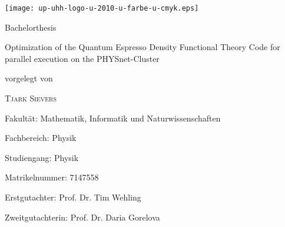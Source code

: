 \documentclass[main.tex]{subfiles}
\begin{document}
\begin{titlepage}
    \texttt{[image: up-uhh-logo-u-2010-u-farbe-u-cmyk.eps]}\par
    \vspace{4\baselineskip}

    \begin{center}
        {\Large\textcolor{UHHred}{Bachelorthesis}\par}

        {\Huge Optimization of the Quantum Espresso Density Functional Theory Code for parallel execution on the PHYSnet-Cluster\par}

        \vspace{4\baselineskip}

        vorgelegt von\par

        {\Large\textsc{Tjark Sievers}\par}
    \end{center}

    \vfill

    Fakultät: Mathematik, Informatik und Naturwissenschaften\par
    Fachbereich: Physik\par
    Studiengang: Physik\par
    Matrikelnummer: 7147558\par
 
    Erstgutachter: Prof. Dr. Tim Wehling \par
    Zweitgutachterin: Prof. Dr. Daria Gorelova \par
\end{titlepage}
\end{document}
